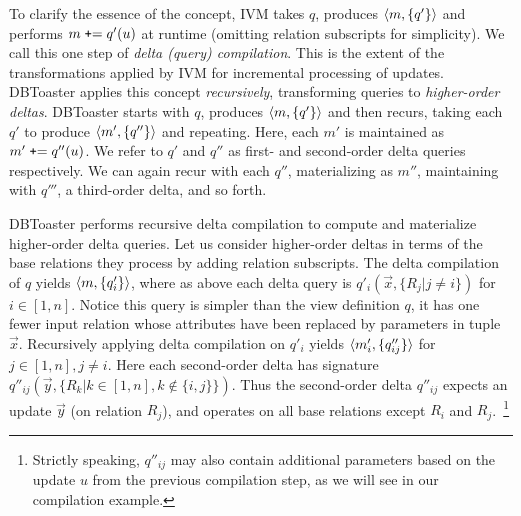 To clarify the essence of the concept, IVM takes $q$, produces
${\langle m,\{q'\}\rangle}$ and performs $m \; \mbox{{\tt +}=} \; q'(u)$ at runtime
(omitting relation subscripts for simplicity). We call this one step of
\textit{delta (query) compilation}. This is the extent of the transformations
applied by IVM for incremental processing of updates. DBToaster applies this
concept \textit{recursively}, transforming queries to \textit{higher-order
deltas}. DBToaster starts with $q$, produces ${\langle m,\{q'\}\rangle}$ and then recurs,
taking each $q'$ to produce ${\langle m', \{q''\}\rangle}$ and repeating. Here, each $m'$
is maintained as $m' \; \mbox{{\tt +}=} \; q''(u)$. We refer to $q'$ and $q''$
as first- and second-order delta queries respectively. We can again recur with
each $q''$, materializing as $m''$, maintaining with $q'''$, a third-order
delta, and so forth.

DBToaster performs recursive delta compilation to compute and materialize
higher-order delta queries. Let us consider higher-order deltas in
terms of the base relations they process by adding relation subscripts. The
delta compilation of $q$ yields ${\langle m,\{q'_i\}\rangle}$, where as above each delta
query is $q'_i(\vec{x}, \{R_j | j \neq i\})$ for $i \in [1,n]$. Notice this
query is simpler than the view definition $q$, it has one fewer input relation
whose attributes have been replaced by parameters in tuple $\vec{x}$.
Recursively applying delta compilation on $q'_i$ yields
${\langle m'_i, \{q''_{ij}\}\rangle}$ for $j \in [1,n], j \neq i$. Here each second-order
delta has signature $q''_{ij}(\vec{y},\{R_k | k \in [1,n], k \notin \{i,j\}\})$.
Thus the second-order delta $q''_{ij}$ expects an update $\vec{y}$ (on relation
$R_j$), and operates on all base relations except $R_i$ and
$R_j$.~\footnote{Strictly speaking, $q''_{ij}$ may also contain additional
parameters based on the update $u$ from the previous compilation step, as we
will see in our compilation example.}

